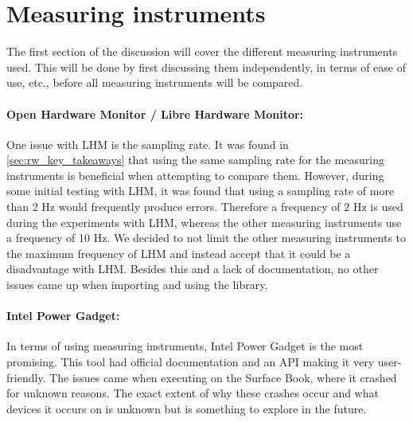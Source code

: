 \section{Measuring instruments}

The first section of the discussion will cover the different measuring instruments used. This will be done by first discussing them independently, in terms of ease of use, etc., before all measuring instruments will be compared.

\paragraph*{Open Hardware Monitor / Libre Hardware Monitor:} One issue with LHM is the sampling rate. It was found in \cref{sec:rw_key_takeaways} that using the same sampling rate for the measuring instruments is beneficial when attempting to compare them. However, during some initial testing with LHM, it was found that using a sampling rate of more than 2 Hz would frequently produce errors. Therefore a frequency of 2 Hz is used during the experiments with LHM, whereas the other measuring instruments use a frequency of 10 Hz. We decided to not limit the other measuring instruments to the maximum frequency of LHM and instead accept that it could be a disadvantage with LHM. Besides this and a lack of documentation, no other issues came up when importing and using the library.

\paragraph*{Intel Power Gadget:} In terms of using measuring instruments, Intel Power Gadget is the most promising. This tool had official documentation and an API making it very user-friendly. The issues came when executing on the Surface Book, where it crashed for unknown reasons. The exact extent of why these crashes occur and what devices it occurs on is unknown but is something to explore in the future.

